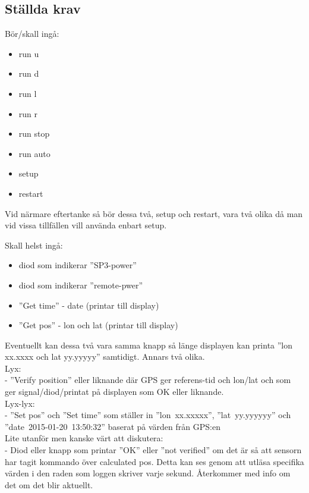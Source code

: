 \documentclass{article}
\begin{document}
	\subsection*{Ställda krav} %
	\label{sub:stallda_krav}

	
		\noindent Bör/skall ingå:
		\begin{itemize}
			\item run u
			\item run d
			\item run l
			\item run r
			\item run stop
			\item run auto
			\item setup
			\item restart 
		\end{itemize}

	\noindent Vid närmare eftertanke så bör dessa två, setup och restart, vara två olika då man vid vissa tillfällen vill använda enbart setup.


	\noindent Skall helst ingå:
	\begin{itemize}
		\item  diod som indikerar ”SP3-power”
		\item  diod som indikerar ”remote-pwer”
		\item  ”Get time” - date (printar till display)
		\item  ”Get pos” - lon och lat (printar till display)
	\end{itemize}

	\noindent Eventuellt kan dessa två vara samma knapp så länge displayen kan printa ”lon xx.xxxx och lat yy.yyyyy” samtidigt. Annars två	 olika. \\

	\noindent Lyx: \\
	-	”Verify position” eller liknande där GPS ger referens-tid och lon/lat och som ger signal/diod/printat på displayen som OK eller liknande. \\


	\noindent Lyx-lyx: \\
	-	”Set pos” och ”Set time” som ställer in \hbox{''lon xx.xxxxx''}, \hbox{''lat yy.yyyyyy''} och \hbox{''date 2015-01-20 13:50:32''} baserat på värden från GPS:en \\

	\noindent Lite utanför men kanske värt att diskutera: \\
-	Diod eller knapp som printar ”OK” eller ”not verified” om det är så att sensorn har tagit kommando över calculated pos. Detta kan ses genom att utläsa specifika värden i den raden som loggen skriver varje sekund. Återkommer med info om det om det blir aktuellt.
	
\end{document}

